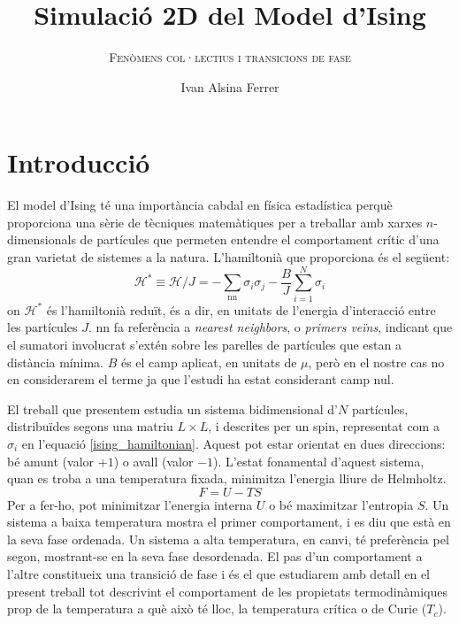 \documentclass[a4paper]{article}
\title{\textbf{Simulació 2D del Model d'Ising}}
\subtitle{\scshape{Fenòmens col·lectius i transicions de fase}}
\author{Ivan Alsina Ferrer}
\date{}
\begin{document}
\maketitle

\section{Introducció}

El model d'Ising té una importància cabdal en física estadística perquè proporciona una sèrie de tècniques matemàtiques per a treballar amb xarxes $n$-dimensionals de partícules que permeten entendre el comportament crític d'una gran varietat de sistemes a la natura. L'hamiltonià que proporciona és el següent:
\begin{equation} \label{ising_hamiltonian}
    \mathcal{H}^* \equiv \mathcal{H}/J = -\sum_\text{nn} \sigma_i \sigma_j - \frac{B}{J} \sum_{i=1}^{N} \sigma_i
\end{equation}
on $\mathcal{H}^*$ és l'hamiltonià reduït, és a dir, en unitats de l'energia d'interacció entre les partícules $J$. nn fa referència a \textit{nearest neighbors}, o \textit{primers veïns}, indicant que el sumatori involucrat s'extén sobre les parelles de partícules que estan a distància mínima. $B$ és el camp aplicat, en unitats de $\mu$, però en el nostre cas no en considerarem el terme ja que l'estudi ha estat considerant camp nul.

El treball que presentem estudia un sistema bidimensional d'$N$ partícules, distribuïdes segons una matriu $L\times L$, i descrites per un spin, representat com a $\sigma_i$ en l'equació \eqref{ising_hamiltonian}. Aquest pot estar orientat en dues direccions: bé amunt (valor $+1$) o avall (valor $-1$). L'estat fonamental d'aquest sistema, quan es troba a una temperatura fixada, minimitza l'energia lliure de Helmholtz.
\begin{equation*}
    F = U - TS
\end{equation*}
Per a fer-ho, pot minimitzar l'energia interna $U$ o bé maximitzar l'entropia $S$. Un sistema a baixa temperatura mostra el primer comportament, i es diu que està en la seva fase ordenada. Un sistema a alta temperatura, en canvi, té preferència pel segon, mostrant-se en la seva fase desordenada. El pas d'un comportament a l'altre constitueix una transició de fase i és el que estudiarem amb detall en el present treball tot descrivint el comportament de les propietats termodinàmiques prop de la temperatura a què això té lloc, la temperatura crítica o de Curie ($T_c$).
\end{document}
